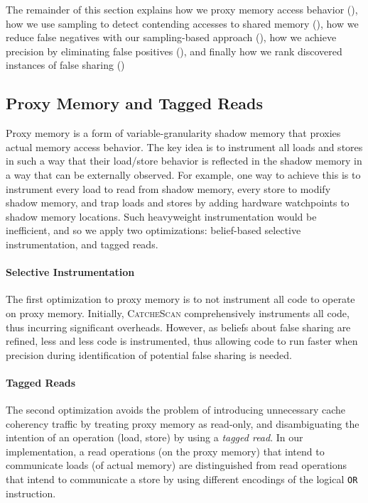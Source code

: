 \documentclass{sig-alternate}
\newcommand{\TextToolname}{CatcheScan}
\newcommand{\Toolname}{\textsc{\TextToolname{}}}
\begin{document}
The remainder of this section explains how we proxy memory access behavior (), how we use sampling
to detect contending accesses to shared memory (), how we reduce false negatives with our
sampling-based approach (), how we achieve precision by eliminating false positives (),
and finally how we rank discovered instances of false sharing ()

\subsection{Proxy Memory and Tagged Reads}\label{sec:proxymem}
Proxy memory is a form of variable-granularity shadow memory that proxies actual memory access behavior. The key
idea is to instrument all loads and stores in such a way that their load/store behavior is reflected in the shadow
memory in a way that can be externally observed. For example, one way to achieve this is to instrument every load
to read from shadow memory, every store to modify shadow memory, and trap loads and stores by adding hardware
watchpoints to shadow memory locations. Such heavyweight instrumentation would be inefficient, and so we apply
two optimizations: belief-based selective instrumentation, and tagged reads.

\paragraph{Selective Instrumentation}
The first optimization to proxy memory is to not instrument all code to operate on proxy memory. Initially, \Toolname{}
comprehensively instruments all code, thus incurring significant overheads. However, as beliefs about false sharing
are refined, less and less code is instrumented, thus allowing code to run faster when precision during identification of
potential false sharing is needed.

\paragraph{Tagged Reads}
The second optimization avoids the problem of introducing unnecessary cache coherency traffic by treating proxy memory
as read-only, and disambiguating the intention of an operation (load, store) by using a \emph{tagged read}. In our implementation,
a read operations (on the proxy memory) that intend to communicate loads (of actual memory) are distinguished from
read operations that intend to communicate a store by using different encodings of the logical \texttt{OR} instruction.
\end{document}
